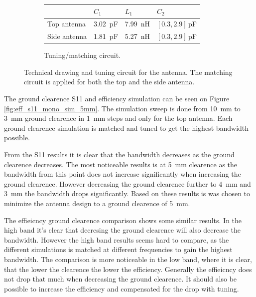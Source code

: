 \begin{figure}[htbp]
\begin{subfigure}[b]{0.49\linewidth}
\footnotesize
        \begin{tabular}{|l|l|l|l|}
            \hline
            & $C_1$ & $L_1$ & $C_2$ \\
            \hline
            Top antenna & \SI{3.02}{pF} & \SI{7.99}{nH} & $[0.3,2.9]\,$pF\\
            Side antenna & \SI{1.81}{pF} & \SI{5.27}{nH} & $[0.3,2.9]\,$pF\\
            \hline
        \end{tabular}
        \caption{Tuning/matching circuit.}
        \label{fig:ant1_tuning}
    \end{subfigure}
    \caption{Technical drawing and tuning circuit for the antenna.  The matching circuit is applied for both the top and the side antenna.}
    \label{fig:ant1techschem_6pf}
\end{figure}

The ground clearence S11 and efficiency simulation can be seen on Figure \ref{fig:eff_s11_mono_sim_5mm}.
The simulation sweep is done from \SI{10}{mm} to \SI{3}{mm} ground clearence in \SI{1}{mm} steps and only for the top antenna. Each ground clearence simulation is matched and tuned to get the highest bandwidth possible.

From the S11 results it is clear that the bandwidth decreases as the ground clearence decreases. The most noticeable results is at \SI{5}{mm} clearence as the bandwidth from this point does not increase significantly when increasing the ground clearence. However decreasing the ground clearence further to \SI{4}{mm} and \SI{3}{mm} the bandwidth drops significantly. Based on these results is was chosen to minimize the antenna design to a ground clearence of \SI{5}{mm}.

The effieicncy ground clearence comparison shows some similar results. In the high band it's clear that decresing the ground clearence will also decrease the bandwidth. However the high band results seems hard to compare, as the different simulations is matched at different frequencies to gain the highest bandwidth. The comparison is more noticeable in the low band, where it is clear, that the lower the clearence the lower the efficiency. Generally the effieicncy does not drop that much when decreasing the ground clearence. It should also be possible to increase the efficiency and compensated for the drop with tuning.  

